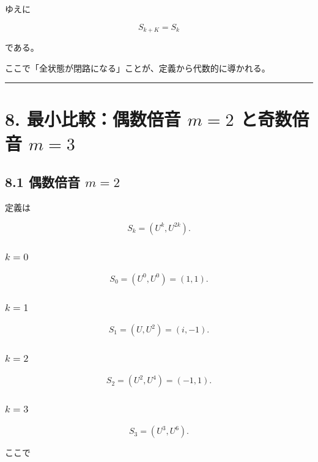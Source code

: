 \documentclass[
  a4paper,
]{ltjsarticle}
\begin{document}
ゆえに

\[
\boxed{
S_{k+K}=S_k
}
\]

である。

ここで「全状態が閉路になる」ことが、定義から代数的に導かれる。

\begin{center}\rule{0.5\linewidth}{0.5pt}\end{center}

\section{\texorpdfstring{8. 最小比較：偶数倍音 \(m=2\) と奇数倍音
\(m=3\)}{8. 最小比較：偶数倍音 m=2 と奇数倍音 m=3}}\label{ux6700ux5c0fux6bd4ux8f03ux5076ux6570ux500dux97f3-m2-ux3068ux5947ux6570ux500dux97f3-m3}

\subsection{\texorpdfstring{8.1 偶数倍音
\(m=2\)}{8.1 偶数倍音 m=2}}\label{ux5076ux6570ux500dux97f3-m2}

定義は

\[
S_k
=
(U^k,U^{2k}).
\]

\subsubsection{\texorpdfstring{\(k=0\)}{k=0}}\label{k0}

\[
S_0
=
(U^0,U^0)
=
(1,1).
\]

\subsubsection{\texorpdfstring{\(k=1\)}{k=1}}\label{k1}

\[
S_1
=
(U,U^2)
=
(i,-1).
\]

\subsubsection{\texorpdfstring{\(k=2\)}{k=2}}\label{k2}

\[
S_2
=
(U^2,U^4)
=
(-1,1).
\]

\subsubsection{\texorpdfstring{\(k=3\)}{k=3}}\label{k3}

\[
S_3
=
(U^3,U^6).
\]

ここで
\end{document}
